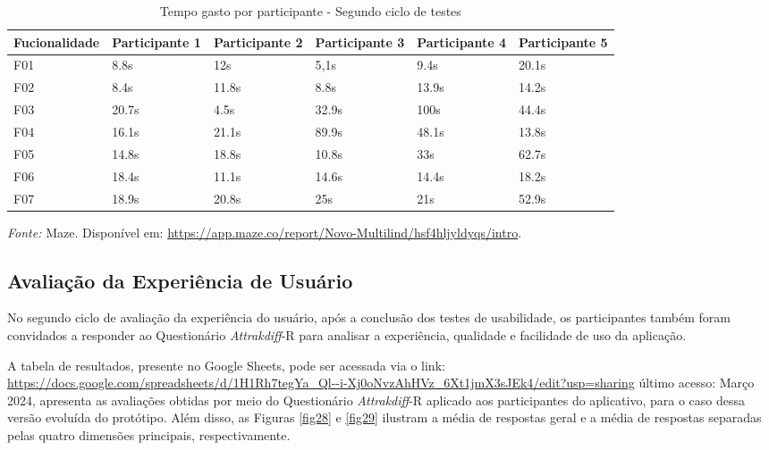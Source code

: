 \begin{table}[h!]
	\centering
	\caption{Tempo gasto por participante - Segundo ciclo de testes}
	\label{tab07}
	\begin{adjustbox}{center}
	\begin{tabular}{l|l|l|l|l|l}
	\hline
	Fucionalidade & Participante 1 & Participante 2 & Participante 3 & Participante 4 & Participante 5 \\ 	\hline
	F01                   & 8.8s     & 12s     & 5,1s      & 9.4s       & 20.1s      \\
	F02                   & 8.4s        & 11.8s      & 8.8s      & 13.9s    & 14.2s     \\
	F03                   & 20.7s        & 4.5s      & 32.9s      & 100s     & 44.4s     \\
	F04                   & 16.1s        & 21.1s     & 89.9s     & 48.1s     & 13.8s     \\
	F05                   & 14.8s      & 18.8s      & 10.8s     & 33s     & 62.7s     \\
	F06                   & 18.4s     & 11.1s      & 14.6s     & 14.4s     & 18.2s     \\
	F07                   & 18.9s     & 20.8s      & 25s     & 21s    & 52.9s       \\ 	\hline
	\end{tabular}
	\end{adjustbox}
	\begin{tablenotes}[flushleft]
		\centering
		\item \textit{Fonte:} Maze. Disponível em: \url{https://app.maze.co/report/Novo-Multilind/hsf4hljyldyqs/intro}.
	  \end{tablenotes}
\end{table}

\subsection{Avaliação da Experiência de Usuário}
\label{sec:Segunda Avaliação da Experiência de Usuário}
No segundo ciclo de avaliação da experiência do usuário, após a conclusão dos testes de usabilidade, os participantes também foram convidados a responder ao Questionário \textit{Attrakdiff}-R para analisar a experiência, qualidade e facilidade de uso da aplicação.

A tabela de resultados, presente no Google Sheets, pode ser acessada via o link: 
\url{https://docs.google.com/spreadsheets/d/1H1Rh7tegYa_Ql--i-Xj0oNvzAhHVz_6Xt1jmX3sJEk4/edit?usp=sharing} último acesso: Março 2024, apresenta as avaliações obtidas por meio do Questionário \textit{Attrakdiff}-R aplicado aos participantes do aplicativo, para o caso 
dessa versão evoluída do protótipo. Além disso, as Figuras \ref{fig28} e \ref{fig29} ilustram a média de respostas geral e a média de respostas separadas pelas quatro dimensões principais, respectivamente.

